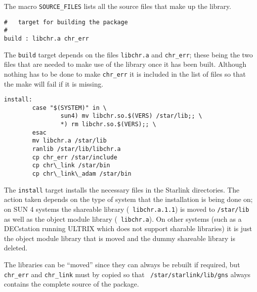 The macro {\tt SOURCE\_FILES} lists all the source files that make up the
library.
\begin{verbatim}
#   target for building the package
#
build : libchr.a chr_err
\end{verbatim}
The {\tt build} target depends on the files {\tt libchr.a} and {\tt chr\_err};
these being the two files that are needed to make use of the library once it has
been built. Although nothing has to be done to make {\tt chr\_err} it is
included in the list of files so that the make will fail if it is missing.
\begin{verbatim}
install:
        case "$(SYSTEM)" in \
                sun4) mv libchr.so.$(VERS) /star/lib;; \
                *) rm libchr.so.$(VERS);; \
        esac
        mv libchr.a /star/lib
        ranlib /star/lib/libchr.a
        cp chr_err /star/include
        cp chr\_link /star/bin
        cp chr\_link\_adam /star/bin
\end{verbatim}
The {\tt install} target installs the necessary files in the Starlink
directories. The action taken depends on the type of system that the
installation is being done on; on SUN 4 systems the shareable library ({\tt
libchr.a.1.1}) is moved to {\tt /star/lib} as well as the
object module library ({\tt
libchr.a}). On other systems (such as a DECstation running ULTRIX
which does not support sharable libraries) it is just the object module library
that is moved and the dummy shareable library is deleted.

The libraries can be ``moved'' since they can always be rebuilt
if required, but {\tt chr\_err} and {\tt chr\_link} must by copied so that {\tt
/star/starlink/lib/gns} always contains the complete source of the package.


